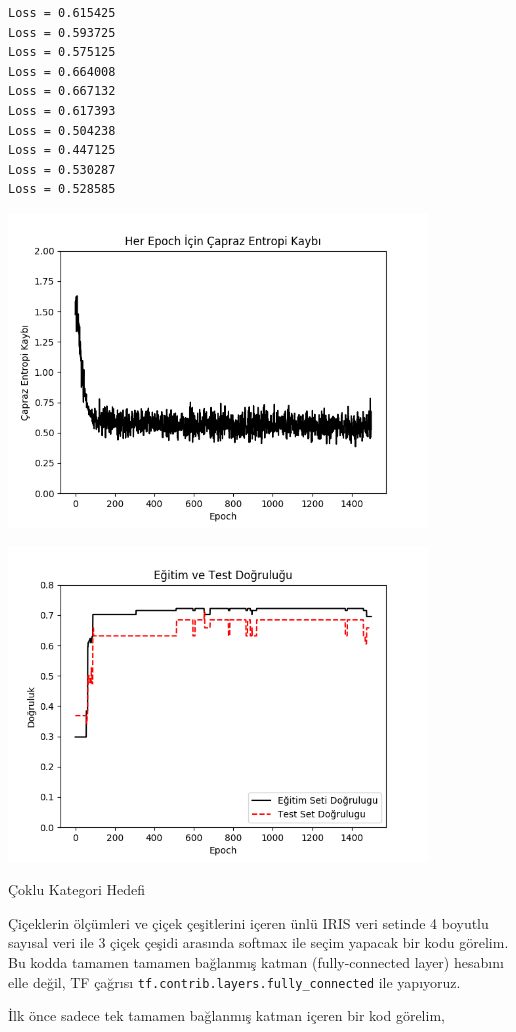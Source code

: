 \documentclass[12pt,fleqn]{article}\usepackage{../../common}
\begin{document}
\begin{verbatim}
Loss = 0.615425
Loss = 0.593725
Loss = 0.575125
Loss = 0.664008
Loss = 0.667132
Loss = 0.617393
Loss = 0.504238
Loss = 0.447125
Loss = 0.530287
Loss = 0.528585
\end{verbatim}

\includegraphics[width=30em]{tf_04.png}

\includegraphics[width=30em]{tf_05.png}

Çoklu Kategori Hedefi

Çiçeklerin ölçümleri ve çiçek çeşitlerini içeren ünlü IRIS veri setinde 4
boyutlu sayısal veri ile 3 çiçek çeşidi arasında softmax ile seçim yapacak
bir kodu görelim. Bu kodda tamamen tamamen bağlanmış katman
(fully-connected layer) hesabını elle değil, TF çağrısı
\verb!tf.contrib.layers.fully_connected! ile yapıyoruz. 

İlk önce sadece tek tamamen bağlanmış katman içeren bir kod görelim,
\end{document}
